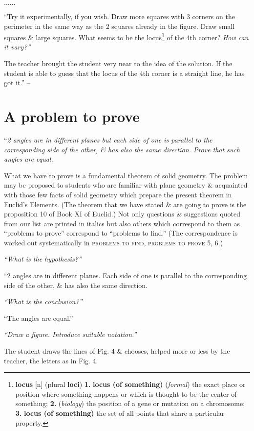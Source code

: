 \documentclass[oneside]{book}
\numberwithin{equation}{section}
\begin{document}
$\ldots\ldots$

``Try it experimentally, if you wish. Draw more squares with 3 corners on the perimeter in the same way as the 2 squares already in the figure. Draw small squares \& large squares. What seems to be the locus\footnote{\textbf{locus} [n] (plural \textbf{loci}) \textbf{1.} \textbf{locus (of something)} (\textit{formal}) the exact place or position where something happens or which is thought to be the center of something; \textbf{2.} (\textit{biology}) the position of a gene or mutation on a chromosome; \textbf{3.} \textbf{locus (of something)} the set of all points that share a particular property.} of the 4th corner? \textit{How can it vary?''}

The teacher brought the student very near to the idea of the solution. If the student is able to guess that the locus of the 4th corner is a straight line, he has got it.'' -- \cite[pp. 23--25]{Polya2014}

\section{A problem to prove}
``\textit{2 angles are in different planes but each side of one is parallel to the corresponding side of the other, \& has also the same direction. Prove that such angles are equal.}

What we have to prove is a fundamental theorem of solid geometry. The problem may be proposed to students who are familiar with plane geometry \& acquainted with those few facts of solid geometry which prepare the present theorem in Euclid's Elements. (The theorem that we have stated \& are going to prove is the proposition 10 of Book XI of Euclid.) Not only questions \& suggestions quoted from our list are printed in italics but also others which correspond to them as ``problems to prove'' correspond to ``problems to find.'' (The correspondence is worked out systematically in \textsc{problems to find, problems to prove 5, 6}.)

\textit{``What is the hypothesis?''}

``2 angles are in different planes. Each side of one is parallel to the corresponding side of the other, \& has also the same direction.

\textit{``What is the conclusion?''}

``The angles are equal.''

\textit{``Draw a figure. Introduce suitable notation.''}

The student draws the lines of Fig. 4 \& chooses, helped more or less by the teacher, the letters as in Fig. 4.
\end{document}
